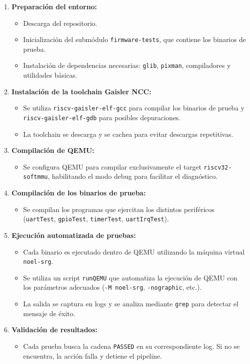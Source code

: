 \begin{enumerate}
    \item \textbf{Preparación del entorno:}
    \begin{itemize}
        \item Descarga del repositorio.
        \item Inicialización del submódulo \texttt{firmware-tests}, que contiene los binarios de prueba.
        \item Instalación de dependencias necesarias: \texttt{glib}, \texttt{pixman}, compiladores y utilidades básicas.
    \end{itemize}

    \item \textbf{Instalación de la toolchain Gaisler NCC:}
    \begin{itemize}
        \item Se utiliza \texttt{riscv-gaisler-elf-gcc} para compilar los binarios de prueba y \texttt{riscv-gaisler-elf-gdb} para posibles depuraciones.
        \item La toolchain se descarga y se cachea para evitar descargas repetitivas.
    \end{itemize}

    \item \textbf{Compilación de QEMU:}
    \begin{itemize}
        \item Se configura QEMU para compilar exclusivamente el target \texttt{riscv32-softmmu}, habilitando el modo debug para facilitar el diagnóstico.
    \end{itemize}

    \item \textbf{Compilación de los binarios de prueba:}
    \begin{itemize}
        \item Se compilan los programas que ejercitan los distintos periféricos (\texttt{uartTest}, \texttt{gpioTest}, \texttt{timerTest}, \texttt{uartIrqTest}).
    \end{itemize}

    \item \textbf{Ejecución automatizada de pruebas:}
    \begin{itemize}
        \item Cada binario es ejecutado dentro de QEMU utilizando la máquina virtual \texttt{noel-srg}.
        \item Se utiliza un script \texttt{runQEMU} que automatiza la ejecución de QEMU con los parámetros adecuados (\texttt{-M noel-srg}, \texttt{-nographic}, etc.).
        \item La salida se captura en logs y se analiza mediante \texttt{grep} para detectar el mensaje de éxito.
    \end{itemize}

    \item \textbf{Validación de resultados:}
    \begin{itemize}
        \item Cada prueba busca la cadena \texttt{PASSED} en su correspondiente log. Si no se encuentra, la acción falla y detiene el pipeline.
    \end{itemize}
\end{enumerate}

